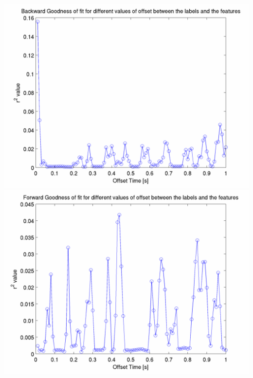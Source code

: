 \documentclass[12pt]{article}
\begin{document}
\newpage
\includegraphics[scale=0.2]{regression_r_value_forward.png}
\includegraphics[scale=0.2]{regression_r_value_backward.png}
\end{document}
